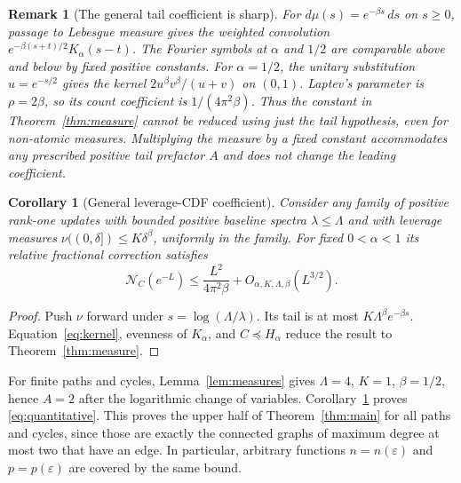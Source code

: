 \documentclass[11pt]{article}
\newtheorem{corollary}[theorem]{Corollary}
\newtheorem{remark}[theorem]{Remark}
\newcommand{\N}{\mathcal N}
\begin{document}
\begin{remark}[The general tail coefficient is sharp]
For $d\mu(s)=e^{-\beta s}\,ds$ on $s\ge0$, passage to Lebesgue
measure gives the weighted convolution
$e^{-\beta(s+t)/2}K_\alpha(s-t)$. The Fourier symbols at $\alpha$
and $1/2$ are comparable above and below by fixed positive constants.
For $\alpha=1/2$, the unitary substitution $u=e^{-s/2}$ gives the
kernel $2u^\beta v^\beta/(u+v)$ on $(0,1)$.
Laptev's parameter is $\rho=2\beta$, so its count coefficient is
$1/(4\pi^2\beta)$. Thus the constant in
Theorem~\ref{thm:measure} cannot be reduced using just the tail
hypothesis, even for non-atomic measures. Multiplying the measure by
a fixed constant accommodates any prescribed positive tail prefactor
$A$ and does not change the leading coefficient.
\end{remark}

\begin{corollary}[General leverage-CDF coefficient]\label{cor:cdf}
Consider any family of positive rank-one updates with bounded positive
baseline spectra $\lambda\le\Lambda$ and with leverage measures
$\nu((0,\delta])\le K\delta^\beta$, uniformly in the family.
For fixed $0<\alpha<1$ its relative fractional correction satisfies
\[
 \N_C(e^{-L})\le\frac{L^2}{4\pi^2\beta}
                      +O_{\alpha,K,\Lambda,\beta}(L^{3/2}).
\]
\end{corollary}
\begin{proof}
Push $\nu$ forward under $s=\log(\Lambda/\lambda)$.
Its tail is at most $K\Lambda^\beta e^{-\beta s}$.
Equation~\eqref{eq:kernel}, evenness of $K_\alpha$, and
$C\preceq H_\alpha$ reduce the result to Theorem~\ref{thm:measure}.
\end{proof}

For finite paths and cycles, Lemma~\ref{lem:measures} gives
$\Lambda=4$, $K=1$, $\beta=1/2$, hence $A=2$ after the logarithmic
change of variables. Corollary~\ref{cor:cdf} proves
\eqref{eq:quantitative}. This proves the upper half of
Theorem~\ref{thm:main} for all paths and cycles, since those are exactly
the connected graphs of maximum degree at most two that have an edge.
In particular, arbitrary functions $n=n(\varepsilon)$ and
$p=p(\varepsilon)$ are covered by the same bound.
\end{document}
